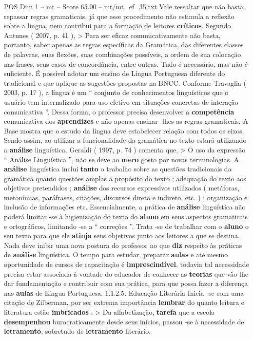 \begin{textsample}{POS Dim 1 – mt – Score 65.00 – mt/mt\_ef\_35.txt}
Vale ressaltar que não basta repassar regras gramaticais, já que esse procedimento não estimula a reflexão sobre a língua, nem contribui para a formação de leitores \textbf{críticos}.
Segundo Antunes ( 2007, p. 41 ), > Para ser eficaz comunicativamente não basta, portanto, saber apenas as regras específicas da Gramática, das diferentes classes de palavras, suas flexões, suas combinações possíveis, a ordem de sua colocação nas frases, seus casos de concordância, entre outras.
Tudo é necessário, mas não é suficiente.
É possível adotar um ensino de Língua Portuguesa diferente do tradicional e que aplique as sugestões propostas na BNCC.
Conforme Travaglia ( 2003, p. 17 ), a língua é um “ conjunto de conhecimentos linguísticos que o usuário tem internalizado para uso efetivo em situações concretas de interação comunicativa ”.
Dessa forma, o professor precisa desenvolver a \textbf{competência} comunicativa dos \textbf{aprendizes} e não apenas ensinar -lhes as regras gramaticais.
A Base mostra que o estudo da língua deve estabelecer relação com todos os eixos.
Sendo assim, ao utilizar a funcionalidade da gramática no texto estará utilizando a \textbf{análise} linguística.
Geraldi ( 1997, p. 74 ) comenta que, > O uso da expressão “ Análise Linguística ”, não se deve ao \textbf{mero} gosto por novas terminologias.
A \textbf{análise} linguística inclui \textbf{tanto} o trabalho sobre as questões tradicionais da gramática quanto questões amplas a propósito do texto ; adequação do texto aos objetivos pretendidos ; \textbf{análise} dos recursos expressivos utilizados ( metáforas, metonímias, paráfrases, citações, discursos direto e indireto, etc. ) ; organização e inclusão de informações etc.
Essencialmente, a prática de \textbf{análise} linguística não poderá limitar -se à higienização do texto do \textbf{aluno} em seus aspectos gramaticais e ortográficos, limitando -se a “ correções ”.
Trata -se de trabalhar com o \textbf{aluno} o seu texto para que ele \textbf{atinja} seus objetivos junto aos leitores a que se destina.
Nada deve inibir uma nova postura do professor no que \textbf{diz} respeito às práticas de \textbf{análise} linguística.
O tempo para estudar, preparar \textbf{aulas} e até mesmo oportunidade de cursos de capacitação é \textbf{imprescindível}, todavia tal necessidade precisa estar associada à vontade do educador de conhecer as \textbf{teorias} que vão lhe dar fundamentação e contribuir com sua prática, para que possa fazer a diferença nas \textbf{aulas} de Língua Portuguesa. 1.1.2.5.
Educação Literária Inicia -se com uma citação de Zilberman, por ser extrema importância \textbf{lembrar} do quanto leitura e literatura estão \textbf{imbricados} : > Da alfabetização, \textbf{tarefa} que a escola \textbf{desempenhou} burocraticamente desde seus inícios, passou -se à necessidade de \textbf{letramento}, sobretudo de \textbf{letramento} literário.

\end{textsample}
